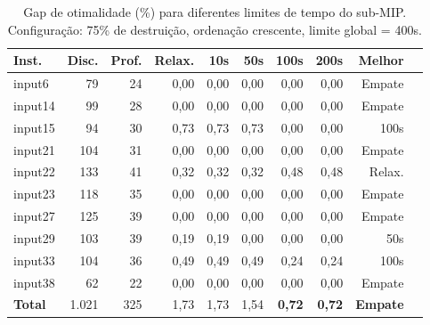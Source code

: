 \begin{table}[htbp]
\centering
\caption{Gap de otimalidade (\%) para diferentes limites de tempo do sub-MIP. Configuração: 75\% de destruição, ordenação crescente, limite global = 400s.}
\label{tab:lns_time_gap}
\small
\begin{tabular}{@{}lrrrrrrrrr@{}}
\toprule
\textbf{Inst.} & \textbf{Disc.} & \textbf{Prof.} & \textbf{Relax.} & \textbf{10s} & \textbf{50s} & \textbf{100s} & \textbf{200s} & \textbf{Melhor} \\
\midrule
input6  & 79  & 24 & 0,00 & 0,00 & 0,00 & 0,00 & 0,00 & Empate \\
input14 & 99  & 28 & 0,00 & 0,00 & 0,00 & 0,00 & 0,00 & Empate \\
input15 & 94  & 30 & 0,73 & 0,73 & 0,73 & 0,00 & 0,00 & 100s \\
input21 & 104 & 31 & 0,00 & 0,00 & 0,00 & 0,00 & 0,00 & Empate \\
input22 & 133 & 41 & 0,32 & 0,32 & 0,32 & 0,48 & 0,48 & Relax. \\
input23 & 118 & 35 & 0,00 & 0,00 & 0,00 & 0,00 & 0,00 & Empate \\
input27 & 125 & 39 & 0,00 & 0,00 & 0,00 & 0,00 & 0,00 & Empate \\
input29 & 103 & 39 & 0,19 & 0,19 & 0,00 & 0,00 & 0,00 & 50s \\
input33 & 104 & 36 & 0,49 & 0,49 & 0,49 & 0,24 & 0,24 & 100s \\
input38 & 62  & 22 & 0,00 & 0,00 & 0,00 & 0,00 & 0,00 & Empate \\
\midrule
\textbf{Total} & 1.021 & 325 & 1,73 & 1,73 & 1,54 & \textbf{0,72} & \textbf{0,72} & \textbf{Empate} \\
\bottomrule
\end{tabular}
\end{table}

